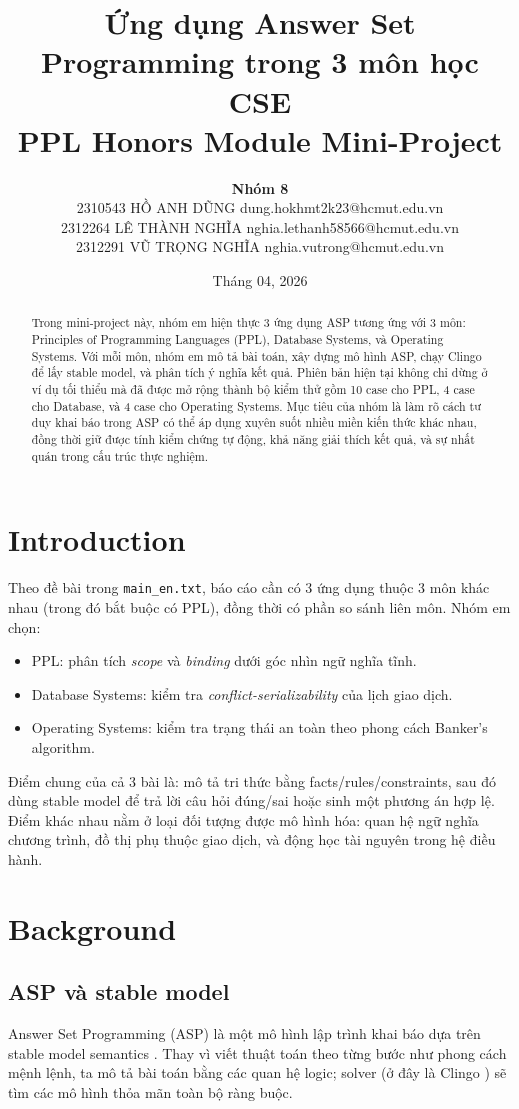 ﻿\documentclass[11pt,a4paper]{article}
\title{\textbf{Ứng dụng Answer Set Programming trong 3 môn học CSE}\\
\large PPL Honors Module Mini-Project}
\author{
  \textbf{Nhóm 8} \\
  2310543 \quad HỒ ANH DŨNG \quad dung.hokhmt2k23@hcmut.edu.vn \\
  2312264 \quad LÊ THÀNH NGHĨA \quad nghia.lethanh58566@hcmut.edu.vn \\
  2312291 \quad VŨ TRỌNG NGHĨA \quad nghia.vutrong@hcmut.edu.vn
}
\date{Tháng 04, 2026}
\begin{document}
\maketitle

\begin{abstract}
Trong mini-project này, nhóm em hiện thực 3 ứng dụng ASP tương ứng với 3 môn: Principles of Programming Languages (PPL), Database Systems, và Operating Systems. Với mỗi môn, nhóm em mô tả bài toán, xây dựng mô hình ASP, chạy Clingo để lấy stable model, và phân tích ý nghĩa kết quả. Phiên bản hiện tại không chỉ dừng ở ví dụ tối thiểu mà đã được mở rộng thành bộ kiểm thử gồm 10 case cho PPL, 4 case cho Database, và 4 case cho Operating Systems. Mục tiêu của nhóm là làm rõ cách tư duy khai báo trong ASP có thể áp dụng xuyên suốt nhiều miền kiến thức khác nhau, đồng thời giữ được tính kiểm chứng tự động, khả năng giải thích kết quả, và sự nhất quán trong cấu trúc thực nghiệm.
\end{abstract}

\section{Introduction}
Theo đề bài trong \texttt{main\_en.txt}, báo cáo cần có 3 ứng dụng thuộc 3 môn khác nhau (trong đó bắt buộc có PPL), đồng thời có phần so sánh liên môn. Nhóm em chọn:
\begin{itemize}[leftmargin=1.5em]
  \item PPL: phân tích \textit{scope} và \textit{binding} dưới góc nhìn ngữ nghĩa tĩnh.
  \item Database Systems: kiểm tra \textit{conflict-serializability} của lịch giao dịch.
  \item Operating Systems: kiểm tra trạng thái an toàn theo phong cách Banker's algorithm.
\end{itemize}

Điểm chung của cả 3 bài là: mô tả tri thức bằng facts/rules/constraints, sau đó dùng stable model để trả lời câu hỏi đúng/sai hoặc sinh một phương án hợp lệ. Điểm khác nhau nằm ở loại đối tượng được mô hình hóa: quan hệ ngữ nghĩa chương trình, đồ thị phụ thuộc giao dịch, và động học tài nguyên trong hệ điều hành.

\section{Background}
\subsection{ASP và stable model}
Answer Set Programming (ASP) là một mô hình lập trình khai báo dựa trên stable model semantics \cite{gelfond1988,brewka2011}. Thay vì viết thuật toán theo từng bước như phong cách mệnh lệnh, ta mô tả bài toán bằng các quan hệ logic; solver (ở đây là Clingo \cite{gebser2011}) sẽ tìm các mô hình thỏa mãn toàn bộ ràng buộc.
\end{document}
